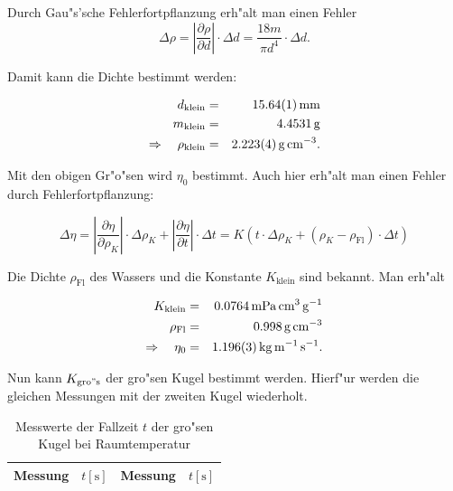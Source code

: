 		Durch Gau"s'sche Fehlerfortpflanzung erh"alt man einen Fehler 
		\begin{equation*}
			\Delta \rho = \left| \frac{\partial \rho}{\partial d} \right| \cdot \Delta d = \frac{18m}{\pi d^4} \cdot \Delta d .
		\end{equation*}

		Damit kann die Dichte bestimmt werden:

		\begin{eqnarray*}
			d_\mathrm{klein} & = & \SI{15.64 (1)}{\milli \meter} \\ 
			m_\mathrm{klein} & = & \SI{4.4531}{\gram} \\
			\Rightarrow \quad \rho_\mathrm{klein} & = & \SI{2.223 (4)}{\gram \per \centi \meter \cubed} .
		\end{eqnarray*}

		Mit den obigen Gr"o"sen wird $\eta_0$ bestimmt.
		Auch hier erh"alt man einen Fehler durch Fehlerfortpflanzung:

		\begin{equation*}
			\Delta \eta = \left| \frac{\partial \eta}{\partial \rho_K} \right| \cdot \Delta \rho_K + \left| \frac{\partial \eta}{\partial t} \right| \cdot \Delta t = K \left(t \cdot \Delta \rho_K + \left(\rho_K - \rho_\mathrm{Fl}\right) \cdot \Delta t \right)
		\end{equation*}

		Die Dichte $\rho_\mathrm{Fl}$ des Wassers und die Konstante $K_\mathrm{klein}$ sind bekannt. Man erh"alt

		\begin{eqnarray*}
			K_\mathrm{klein} & = & \SI{.0764}{\milli \pascal \centi \meter \cubed \per \gram} \\
			\rho_\mathrm{Fl} & = & \SI{.998}{\gram \per \centi \meter \cubed}\\
			\Rightarrow \quad \eta_0 & = & \SI{1.196 (3)}{\kilo \gram \per \meter \per \second} .
		\end{eqnarray*}

		Nun kann $K_\mathrm{gro"s}$ der gro"sen Kugel bestimmt werden.
		Hierf"ur werden die gleichen Messungen mit der zweiten Kugel wiederholt.

		\begin{table}[h!]
			\centering
			\caption{Messwerte der Fallzeit $t$ der gro"sen Kugel bei Raumtemperatur}
			\begin{tabular}{|c|c||c|c|}
				\hline
				Messung & $t [\mathrm{s}]$ & Messung & $t [\mathrm{s}]$ \\
				\hline
				\hline
				
				\hline
			\end{tabular}
		\end{table}

